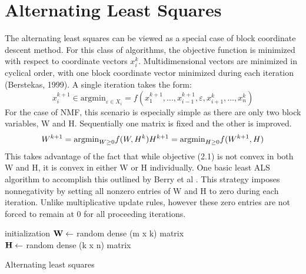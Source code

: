 \documentclass[final,leqno,onefignum,onetabnum]{siamltex1213}
\begin{document}
\section{Alternating Least Squares} The alternating least squares can be viewed as a special case of block coordinate descent method. For this class of algorithms, the objective function is minimized with respect to coordinate vectors $x^{k}_{i}$. Multidimensional vectors are minimized in cyclical order, with one block coordinate vector minimized during each iteration (Berstekas, 1999). A single iteration takes the form:
\begin{equation}\label{bcv1}
 x^{k+1}_{i} \in {\mathrm{argmin}_{\varepsilon \in X_i}} = f( x^{k+1}_{1}, ..., x^{k+1}_{i-1}, \varepsilon, x^{k}_{i+1}, ..., x^{k}_{n})
\end{equation}
For the case of NMF, this scenario is especially simple as there are only two block variables, W and H. Sequentially one matrix is fixed and the other is improved. 
\begin{equation}\label{bcv2}
W^{k+1} = {\mathrm{argmin}_{W \ge 0} f(W,H^k}) \\
H^{k+1} = {\mathrm{argmin}_{H \ge 0} f(W^{k+1},H})
\end{equation}
This takes advantage of the fact that while objective (2.1) is not convex in both W and H, it is convex in either W or H individually. One basic least ALS algorithm to accomplish this outlined by Berry et al \cite{Ber}. This strategy imposes nonnegativity by setting all nonzero entries of W and H to zero during each iteration. Unlike multiplicative update rules, however these zero entries are not forced to remain at 0 for all proceeding iterations. \\

\begin{algorithm}[H]	

 initialization\;
$\bf{W} \gets $ random dense (m x k) matrix\\
$\bf{H} \gets $ random dense (k x n) matrix\\
 \caption{Alternating least squares}
\end{algorithm} 
\end{document}
